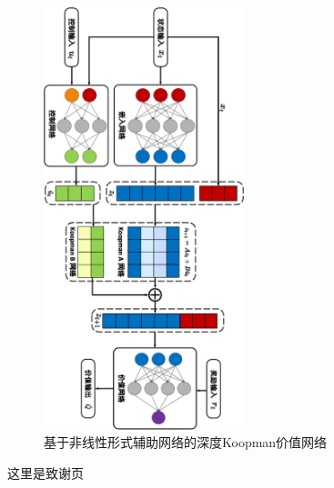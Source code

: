 \documentclass[AutoFakeBold]{LZUThesis}
\begin{document}
\backmatter


\printbib

\Appendix

\begin{figure}[htbp]
  \centering
  \includegraphics[width=0.52\textwidth]{figures/dkn-rotate.pdf}
  \caption{基于非线性形式辅助网络的深度Koopman价值网络}
  \label{DKN_critic}
\end{figure}

\Thanks

这里是致谢页

\Grade %
\end{document}
